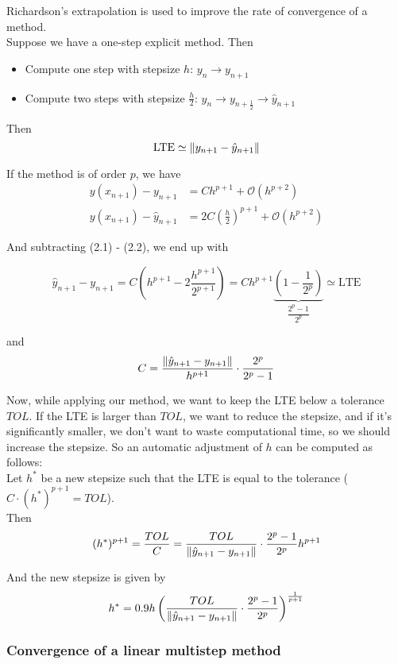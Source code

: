 Richardson's extrapolation is used to improve the rate of convergence of a method.\\

Suppose we have a one-step explicit method. Then
\begin{itemize}
    \item Compute one step with stepsize $h$: $y_n \to y_{n+1}$
    \item Compute two steps with stepsize $\frac{h}{2}$: $y_n \to y_{n+\frac{1}{2}} \to \hat{y}_{n+1}$
\end{itemize}

Then  $$\text{LTE} \simeq \left\lVert y_{n+1} - \hat{y}_{n+1}\right\rVert$$

If the method is of order $p$, we have
\begin{align}
    y(x_{n+1}) - y_{n+1} &= Ch^{p+1} + \mathcal{O}(h^{p+2})\\
    y(x_{n+1}) - \hat{y}_{n+1} &= 2C\left(\frac{h}{2}\right)^{p+1} + \mathcal{O}(h^{p+2})
\end{align}
      
And subtracting (2.1) - (2.2), we end up with

$$\hat{y}_{n+1} - y_{n+1} = C\left(h^{p+1}-2\frac{h^{p+1}}{2^{p+1}}\right) = Ch^{p+1}\underbrace{\left(1-\frac{1}{2^p}\right)}_{\dfrac{2^p-1}{2^p}} \simeq \text{LTE}$$

and $$C = \frac{\left\lVert\hat{y}_{n+1}-y_{n+1}\right\rVert}{h^{p+1}}\cdot\frac{2^p}{2^p-1}$$

Now, while applying our method, we want to keep the LTE below a tolerance $TOL$. If the LTE is larger than $TOL$, we want to reduce the stepsize, and if it's significantly smaller, we don't want to waste computational time, so we should increase the stepsize. So an automatic adjustment of $h$ can be computed as follows: \\

Let $h^*$ be a new stepsize such that the LTE is equal to the tolerance ($C\cdot(h^*)^{p+1} = TOL$).\\

Then $$(h^*)^{p+1} = \frac{TOL}{C} = \frac{TOL}{\left\lVert\hat{y}_{n+1} - y_{n+1}\right\rVert}\cdot\frac{2^p-1}{2^p}h^{p+1}$$

And the new stepsize is given by $$h^* = 0.9h\left(\frac{TOL}{\left\lVert\hat{y}_{n+1} - y_{n+1}\right\rVert}\cdot\frac{2^p-1}{2^p}\right)^{\frac{1}{p+1}}$$

\newpage
\subsubsection{Convergence of a linear multistep method}

